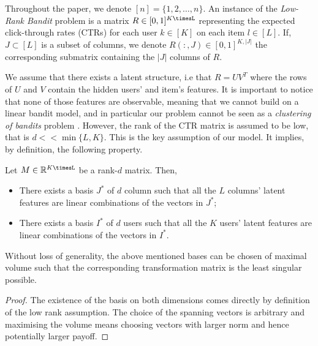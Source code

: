 
Throughout the paper, we denote $[n] = \lbrace 1,2,\ldots, n\rbrace$.
An instance of the \emph{Low-Rank Bandit} problem is a matrix
$R\in [0,1]^{K\timesL}$ representing the expected click-through rates (CTRs) for each
user $k\in [K]$ on each item $l\in [L]$.
If, $J\subset [L]$ is a subset of columns, we denote $R(:,J)\in [0,1]^{K,|J|}$ the corresponding
submatrix containing the $|J|$ columns of $R$.

We assume that there exists a latent structure, i.e that $R=UV^T$ where the rows of
$U$ and $V$ contain the hidden users' and item's features.
It is important to notice that none of those features are observable, meaning that
we cannot build on a linear bandit model, and in particular
our problem cannot be seen as a \emph{clustering of bandits} problem \cite{gentile2014online}.
However, the rank of the CTR matrix is  assumed to be low, that is $d << \min\lbrace L,K\rbrace$.
This is the key assumption of our model.
It implies, by definition, the following property.

\begin{observation}
	Let $M\in \mathbb{R}^{K\timesL}$ be a rank-$d$ matrix. Then,
	\begin{itemize}
		\item There exists a basis $J^*$ of $d$ column such that all the $L$ columns' latent features
		are linear combinations of the vectors in $J^*$;
		\item There exists a basis $I^*$ of $d$ users such that all the $K$ users' latent features
		are linear combinations of the vectors in $I^*$.
	\end{itemize}
	Without loss of generality, the above mentioned bases can be chosen of maximal volume such that
	the corresponding transformation matrix is the least singular possible.
\end{observation}
\begin{proof}
	The existence of the basis on both dimensions comes directly by definition of the
	low rank assumption. The choice of the spanning vectors is arbitrary and maximising the
	volume means choosing vectors with larger norm and hence potentially larger payoff.
\end{proof}


